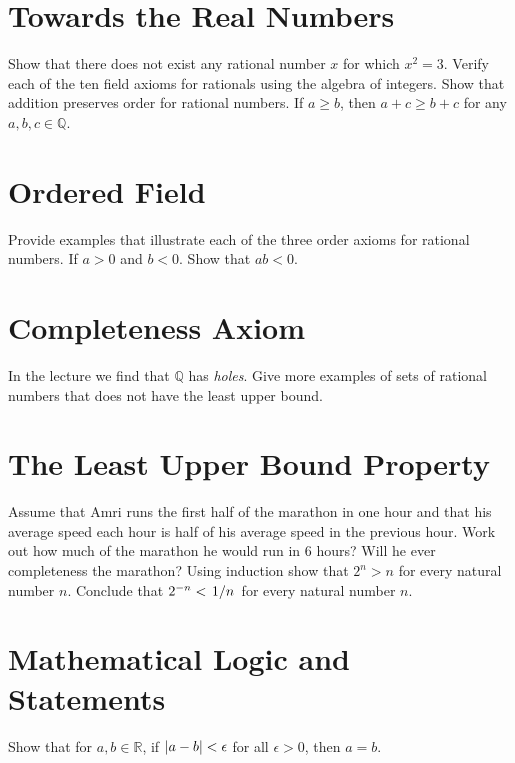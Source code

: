 \documentclass[12pt]{exam}
\begin{document}
\section{Towards the Real Numbers}
\begin{questions}
    \question Show that there does not exist any rational number $x$ for which $x^2 = 3$.
    \question Verify each of the ten field axioms for rationals using the algebra of integers.
    \question Show that addition preserves order for rational numbers. If $a \geq b$, then $a + c \geq b + c$ for any $a, b, c \in \mathbb{Q}$.

\end{questions}
\section{Ordered Field}
\begin{questions}
    \question Provide examples that illustrate each of the three order axioms for rational numbers.
    \question If $a > 0$ and $b < 0$. Show that $ab < 0$.
\end{questions}
\section{Completeness Axiom}
\begin{questions}
    \question In the lecture we find that $\mathbb{Q}$ has \textit{holes}. Give more examples of sets of rational numbers that does not have the least upper bound.
\end{questions}
\section{The Least Upper Bound Property}
\begin{questions}
    \question Assume that Amri runs the first half of the marathon in one hour and that his average speed each hour is half of his average speed in the previous hour. Work out how much of the marathon he would run in 6 hours? Will he ever completeness the marathon?  
    \question Using induction show that $2^n > n$ for every natural number $n$. Conclude that $2^{-n}<\flatfrac{1}{n}$ for every natural number $n$.
\end{questions}
\section{Mathematical Logic and Statements}
\begin{questions}
    \question Show that for $a, b \in \mathbb{R}$, if $\abs{a - b} < \epsilon$ for all $\epsilon > 0$, then $a = b$. 
\end{questions}
\end{document}
